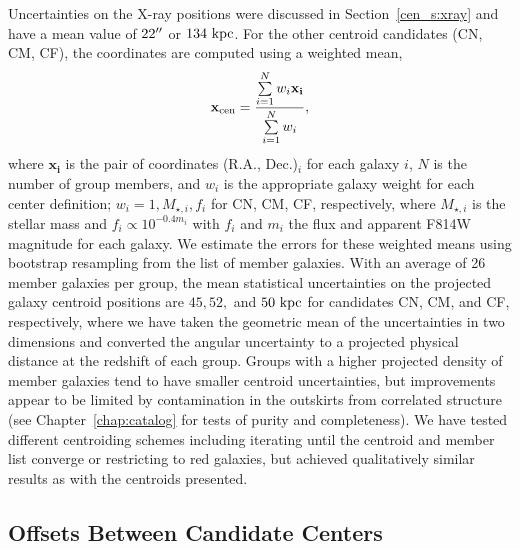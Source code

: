 Uncertainties on the X-ray positions were discussed in Section~\ref{cen_s:xray}
and have a mean value of $22\mbox{$^{\prime\prime}$}$ or $134~\rm{kpc}$. For the other
centroid candidates (CN, CM, CF), the coordinates are computed using a
weighted mean,
\begin{equation}
\mathbf{x_{\rm cen}} = \frac{\sum\limits_{i=1}^{N} w_i \mathbf{x_i}}{\sum\limits_{i=1}^{N} w_i},
\end{equation}
where $\mathbf{x_i}$ is the pair of coordinates (R.A., Dec.)$_i$ for
each galaxy $i$, $N$ is the number of group members, and $w_i$ is the
appropriate galaxy weight for each center definition; $w_i=1,
M_{\star,i}, f_i$ for CN, CM, CF, respectively, where $M_{\star,i}$ is
the stellar mass and $f_i\propto10^{-0.4m_i}$ with $f_i$ and $m_i$ the
flux and apparent F814W magnitude for each galaxy. We estimate the
errors for these weighted means using bootstrap resampling from the
list of member galaxies.
With an average of 26 member galaxies per group, the mean statistical
uncertainties on the projected galaxy centroid positions are $45, 52,$ and
$50~\rm{kpc}$ for candidates CN, CM, and CF, respectively, where we
have taken the geometric mean of the uncertainties in two dimensions
and converted the angular uncertainty to a projected physical distance
at the redshift of each group. Groups with a higher projected density
of member galaxies tend to have smaller centroid uncertainties, but
improvements appear to be limited by contamination in the outskirts
from correlated structure (see Chapter~\ref{chap:catalog} for tests of purity and
completeness). We have tested different centroiding schemes including
iterating until the centroid and member list converge or restricting
to red galaxies, but achieved qualitatively similar results as with
the centroids presented.

\subsection{Offsets Between Candidate Centers}

